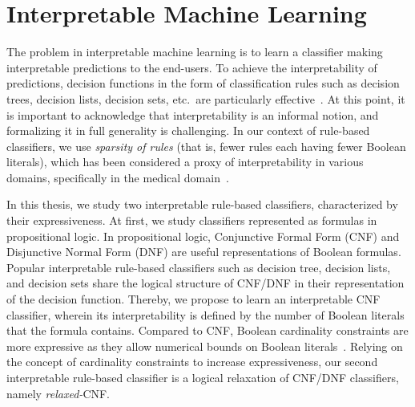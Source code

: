\section{Interpretable Machine Learning}
The problem in interpretable machine learning is to learn a classifier making interpretable predictions to the end-users. To achieve the interpretability of predictions, decision functions in the form of classification rules such as decision trees,  decision lists, decision sets, etc.\ are particularly effective~\cite{bessiere2009minimising,dash2021lprules,ignatiev2021reasoning,izza2020explaining,lakkaraju2017interpretable,lakkaraju2016interpretable,letham2015interpretable,narodytska2018learning,rivest1987learning,wang2015falling,yu2020optimal}.  At this point, it is important to acknowledge that interpretability is an informal notion, and formalizing it in full generality is challenging. In our context of rule-based classifiers, we use \emph{sparsity of rules} (that is, fewer rules each having fewer Boolean literals), which has been considered a proxy of interpretability in various domains, specifically in the medical domain~\cite{gage2001validation,lakkaraju2019faithful,letham2015interpretable,malioutov2013exact,myers1962myers}.





In this thesis, we study two interpretable rule-based classifiers, characterized by their expressiveness. At first, we study classifiers represented as formulas in propositional logic. In propositional logic, Conjunctive Formal Form (CNF) and Disjunctive Normal Form (DNF) are useful representations of Boolean formulas. Popular interpretable rule-based classifiers such as decision tree, decision lists, and decision sets share the logical structure of CNF/DNF in their representation of the decision function. Thereby, we propose to learn an interpretable CNF classifier, wherein its interpretability is defined by the number of Boolean literals that the formula contains. Compared to CNF, Boolean cardinality constraints are more expressive as they allow numerical bounds on Boolean literals~\cite{sinz2005towards}. Relying on the concept of cardinality constraints to increase expressiveness, our second interpretable rule-based classifier is a logical relaxation of CNF/DNF classifiers, namely \emph{relaxed-}CNF. 


